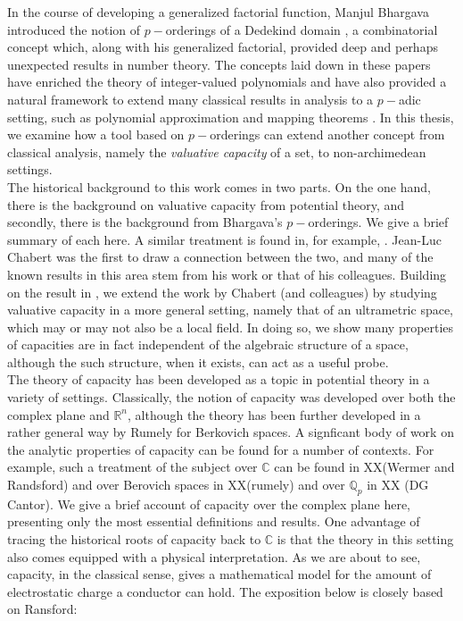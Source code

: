 
In the course of developing a generalized factorial function, Manjul Bhargava introduced the notion of $p-$orderings of a Dedekind domain \cite{mb1, mb2}, a combinatorial concept which, along with his generalized factorial, provided deep and perhaps unexpected results in number theory. The concepts laid down in these papers have enriched the theory of integer-valued polynomials \cite{mb3, kj2} and have also provided a natural framework to extend many classical results in analysis to a $p-$adic setting, such as polynomial approximation and mapping theorems \cite{mb1, mb2,mb3}. In this thesis, we examine how a tool based on $p-$orderings can extend another concept from classical analysis, namely the \textit{valuative capacity} of a set, to non-archimedean settings.\\

The historical background to this work comes in two parts. On the one hand, there is the background on valuative capacity from potential theory, and secondly, there is the background from Bhargava's $p-$orderings. We give a brief summary of each here. A similar treatment is found in, for example, \cite{fp}. Jean-Luc Chabert was the first to draw a connection between the two, and many of the known results in this area stem from his work or that of his colleagues. Building on the result in \cite{kj}, we extend the work by Chabert (and colleagues) by studying valuative capacity in a more general setting, namely that of an ultrametric space, which may or may not also be a local field. In doing so, we show many properties of capacities are in fact independent of the algebraic structure of a space, although the such structure, when it exists, can act as a useful probe.\\

The theory of capacity has been developed as a topic in potential theory in a variety of settings. Classically, the notion of capacity was developed over both the complex plane and $\mathbb{R}^n$, although the theory has been further developed in a rather general way by Rumely for Berkovich spaces. A  signficant body of work on the analytic properties of capacity can be found for a number of contexts. For example, such a treatment of the subject over $\mathbb{C}$ can be found in XX(Wermer and Randsford) and over Berovich spaces in XX(rumely) and over $\mathbb{Q}_p$ in XX (DG Cantor). We give a brief account of capacity over the complex plane here, presenting only the most essential definitions and results.   One advantage of tracing the historical roots of capacity back to $\mathbb{C}$ is that the theory in this setting also comes equipped with a physical interpretation. As we are about to see, capacity, in the classical sense, gives a mathematical model for the amount of electrostatic charge a conductor can hold. The exposition below is closely based on Ransford:

